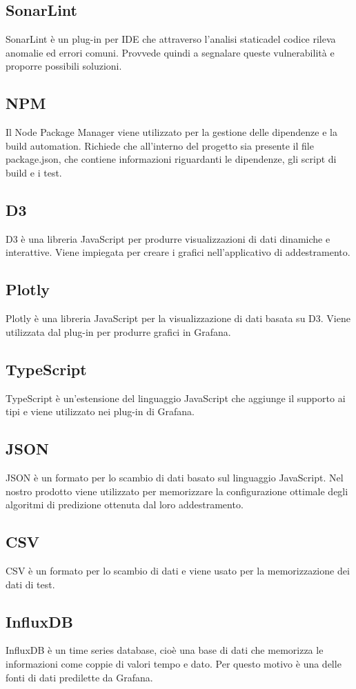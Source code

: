 	\subsection{SonarLint}
		SonarLint è un plug-in per IDE che attraverso l'analisi statica\glosp del codice rileva anomalie ed errori comuni. Provvede quindi a segnalare queste vulnerabilità e proporre possibili soluzioni.
	\subsection{NPM}
		Il Node Package Manager viene utilizzato per la gestione delle dipendenze e la build automation.
		Richiede che all'interno del progetto sia presente il file package.json, che contiene informazioni riguardanti le dipendenze, gli script di build e i test.
	\subsection{D3}
		D3 è una libreria JavaScript per produrre visualizzazioni di dati dinamiche e interattive. Viene impiegata per creare i grafici nell'applicativo di addestramento.
	\subsection{Plotly}
		Plotly è una libreria JavaScript per la visualizzazione di dati basata su D3. Viene utilizzata dal plug-in per produrre grafici in Grafana\glo.
	\subsection{TypeScript}
		TypeScript è un'estensione del linguaggio JavaScript che aggiunge il supporto ai tipi e viene utilizzato nei plug-in di Grafana\glo.
	\subsection{JSON}
		JSON è un formato per lo scambio di dati basato sul linguaggio JavaScript. Nel nostro prodotto viene utilizzato per memorizzare la configurazione ottimale degli algoritmi di predizione ottenuta dal loro addestramento.
	\subsection{CSV}
		CSV è un formato per lo scambio di dati e viene usato per la memorizzazione dei dati di test.
	\subsection{InfluxDB}
		InfluxDB è un time series database, cioè una base di dati che memorizza le informazioni come coppie di valori tempo e dato. Per questo motivo è una delle fonti di dati predilette da Grafana\glo.
